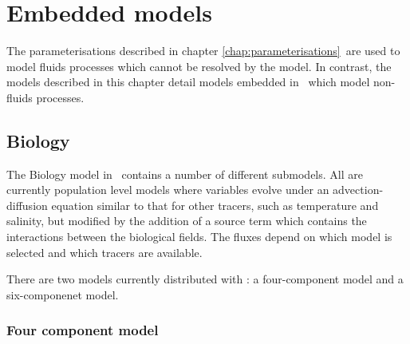 \chapter{Embedded models}\label{chap:embedded}

The parameterisations described in chapter \ref{chap:parameterisations}\ are
used to model fluids processes which cannot be resolved by the model. In
contrast, the models described in this chapter detail models embedded in
\fluidity\ which model non-fluids processes.

\section{Biology}
\label{sec:biology_model}
The Biology model in \fluidity\ contains a number of different submodels. All are
currently population level models where variables evolve under an 
advection-diffusion equation similar to that for other tracers, such as 
temperature and salinity, but modified by the
addition of a source term which contains the interactions between the
biological fields. The fluxes depend on which model is selected and which
tracers are available. 

There are two models currently distributed with \fluidity: a four-component model
and a six-componenet model.

\subsection{Four component model}

